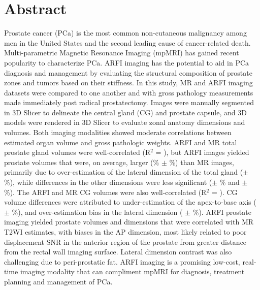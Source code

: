 \section*{Abstract}
Prostate cancer (PCa) is the most common non-cutaneous malignancy among men in
the United States and the second leading cause of cancer-related death.
Multi-parametric Magnetic Resonance Imaging (mpMRI) has gained recent
popularity to characterize PCa.  ARFI imaging has the potential to aid in PCa
diagnosis and management by evaluating the structural composition of prostate
zones and tumors based on their stiffness.  In this study, MR and ARFI imaging
datasets were compared to one another and with gross pathology measurements
made immediately post radical prostatectomy.  Images were manually segmented in
3D Slicer to delineate the central gland (CG) and prostate capsule, and 3D
models were rendered in 3D Slicer to evaluate zonal anatomy dimensions and
volumes.  Both imaging modalities showed moderate correlations between
estimated organ volume and gross pathologic weights.  ARFI and MR total
prostate gland volumes were well-correlated (R$^2$ = \MRarfiVolTotalRsq), but
ARFI images yielded prostate volumes that were, on average, larger
(\MRarfiVolTotalMeanDiff\% $\pm$ \MRarfiVolTotalStdDiff\%) than MR images,
primarily due to over-estimation of the lateral dimension of the total gland
(\ARFImrTotalLatLatMeanPct $\pm$ \ARFImrTotalLatLatStdPct\%), while differences
in the other dimensions were less significant (\ARFImrTotalAntPostMeanPct $\pm$
\ARFImrTotalAntPostStdPct\% and \ARFImrTotalApexBaseMeanPct $\pm$
\ARFImrTotalApexBaseStdPct\%).  The ARFI and MR CG volumes were also
well-correlated (R$^2$ = \MRarfiVolCentralRsq).  CG volume differences were
attributed to under-estimation of the apex-to-base axis
(\ARFImrCentralApexBaseMeanPct $\pm$ \ARFImrCentralApexBaseStdPct\%), and
over-estimation bias in the lateral dimension (\ARFImrCentralLatLatMeanPct
$\pm$ \ARFImrCentralLatLatStdPct\%).  ARFI prostate imaging yielded prostate
volumes and dimensions that were correlated with MR T2WI estimates, with biases
in the AP dimension, most likely related to poor displacement SNR in the
anterior region of the prostate from greater distance from the rectal wall
imaging surface.  Lateral dimension contrast was also challenging due to
peri-prostatic fat.  ARFI imaging is a promising low-cost, real-time imaging
modality that can compliment mpMRI for diagnosis, treatment planning and
management of PCa.
